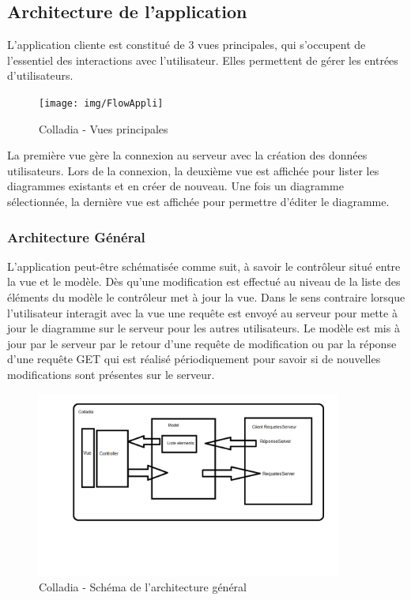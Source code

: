 \subsection{Architecture de l'application}
L'application cliente est constitué de 3 vues principales, qui s'occupent de l'essentiel des interactions avec l'utilisateur.
Elles permettent de gérer les entrées d'utilisateurs.
	\begin{figure}[!h]
		\centering
		\texttt{[image: img/FlowAppli]}
		\caption{Colladia - Vues principales}
	\end{figure}
La première vue gère la connexion au serveur avec la création des données utilisateurs. Lors de la connexion, la deuxième vue est affichée pour lister les diagrammes existants et en créer de nouveau.
Une fois un diagramme sélectionnée, la dernière vue est affichée pour permettre d'éditer le diagramme. 

\subsubsection{Architecture Général}
L'application peut-être schématisée comme suit, à savoir le contrôleur situé entre la vue et le modèle. Dès qu'une modification est effectué au niveau de la liste des éléments du modèle le contrôleur met à jour la vue.
Dans le sens contraire lorsque l'utilisateur interagit avec la vue une requête est envoyé au serveur pour mette à jour le diagramme sur le serveur pour les autres utilisateurs.
Le modèle est mis à jour par le serveur par le retour d'une requête de modification ou par la réponse d'une requête GET qui est réalisé périodiquement pour savoir si de nouvelles modifications sont présentes sur le serveur. 
	\begin{figure}[!h]
		\centering
		\includegraphics[width=10cm]{img/archiGeneral}
		\caption{Colladia - Schéma de l'architecture général}
	\end{figure}
